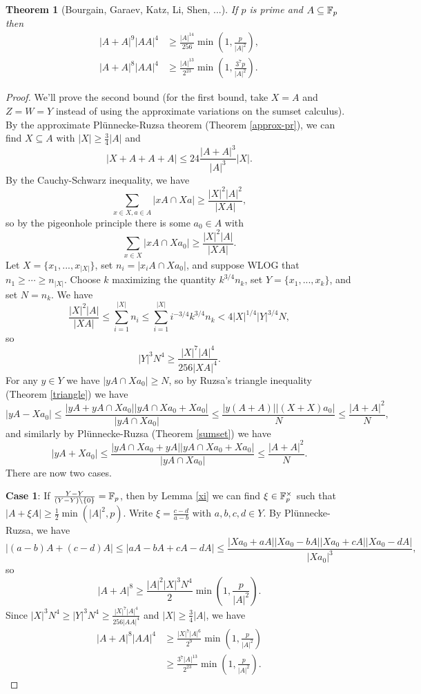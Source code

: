 \documentclass[letterpaper,11pt]{article}
\newtheorem{thm}{Theorem}
\theoremstyle{definition}
\theoremstyle{remark}
\begin{document}
\begin{thm}[Bourgain, Garaev, Katz, Li, Shen, ...] If $p$ is prime and $A \subseteq \mathbb{F}_p$ then
\begin{align*}
|A+A|^9|AA|^4 &\ge \frac{|A|^{14}}{256}\min\left(1,\frac{p}{|A|^2}\right),\\
|A+A|^8|AA|^4 &\ge \frac{|A|^{13}}{2^{23}}\min\left(1,\frac{3^7p}{|A|^2}\right).
\end{align*}
\end{thm}
\begin{proof} We'll prove the second bound (for the first bound, take $X=A$ and $Z=W=Y$ instead of using the approximate variations on the sumset calculus). By the approximate Pl\"unnecke-Ruzsa theorem (Theorem \ref{approx-pr}), we can find $X \subseteq A$ with $|X| \ge \frac{3}{4}|A|$ and
\[
|X+A+A+A| \le 24\frac{|A+A|^3}{|A|^3}|X|.
\]
By the Cauchy-Schwarz inequality, we have
\[
\sum_{x\in X,a\in A} |xA\cap Xa| \ge \frac{|X|^2|A|^2}{|XA|},
\]
so by the pigeonhole principle there is some $a_0\in A$ with
\[
\sum_{x\in X} |xA\cap Xa_0| \ge \frac{|X|^2|A|}{|XA|}.
\]
Let $X = \{x_1, ..., x_{|X|}\}$, set $n_i = |x_iA\cap Xa_0|$, and suppose WLOG that $n_1 \ge \cdots \ge n_{|X|}$. Choose $k$ maximizing the quantity $k^{3/4}n_k$, set $Y = \{x_1, ..., x_k\}$, and set $N = n_k$. We have
\[
\frac{|X|^2|A|}{|XA|} \le \sum_{i=1}^{|X|} n_i \le \sum_{i=1}^{|X|} i^{-3/4}k^{3/4}n_k < 4|X|^{1/4}|Y|^{3/4}N,
\]
so
\[
|Y|^3N^4 \ge \frac{|X|^7|A|^4}{256|XA|^4}.
\]
For any $y\in Y$ we have $|yA\cap Xa_0| \ge N$, so by Ruzsa's triangle inequality (Theorem \ref{triangle}) we have
\[
|yA-Xa_0| \le \frac{|yA+yA\cap Xa_0||yA\cap Xa_0+Xa_0|}{|yA\cap Xa_0|} \le \frac{|y(A+A)||(X+X)a_0|}{N} \le \frac{|A+A|^2}{N},
\]
and similarly by Pl\"unnecke-Ruzsa (Theorem \ref{sumset}) we have
\[
|yA+Xa_0| \le \frac{|yA\cap Xa_0+yA||yA\cap Xa_0+Xa_0|}{|yA\cap Xa_0|} \le \frac{|A+A|^2}{N}.
\]
There are now two cases.

\textbf{Case 1}: If $\frac{Y-Y}{(Y-Y)\setminus\{0\}} = \mathbb{F}_p$, then by Lemma \ref{xi} we can find $\xi \in \mathbb{F}_p^\times$ such that $|A+\xi A| \ge \frac{1}{2}\min(|A|^2,p)$. Write $\xi = \frac{c-d}{a-b}$ with $a,b,c,d \in Y$. By Pl\"unnecke-Ruzsa, we have
\[
|(a-b)A+(c-d)A| \le |aA-bA+cA-dA| \le \frac{|Xa_0+aA||Xa_0-bA||Xa_0+cA||Xa_0-dA|}{|Xa_0|^3},
\]
so
\[
|A+A|^8 \ge \frac{|A|^2|X|^3N^4}{2}\min\left(1,\frac{p}{|A|^2}\right).
\]
Since $|X|^3N^4 \ge |Y|^3N^4 \ge \frac{|X|^7|A|^4}{256|AA|^4}$ and $|X| \ge \frac{3}{4}|A|$, we have
\begin{align*}
|A+A|^8|AA|^4 &\ge \frac{|X|^7|A|^6}{2^9}\min\left(1,\frac{p}{|A|^2}\right)\\
&\ge \frac{3^7|A|^{13}}{2^{23}}\min\left(1,\frac{p}{|A|^2}\right).
\end{align*}


\end{proof}
\end{document}
